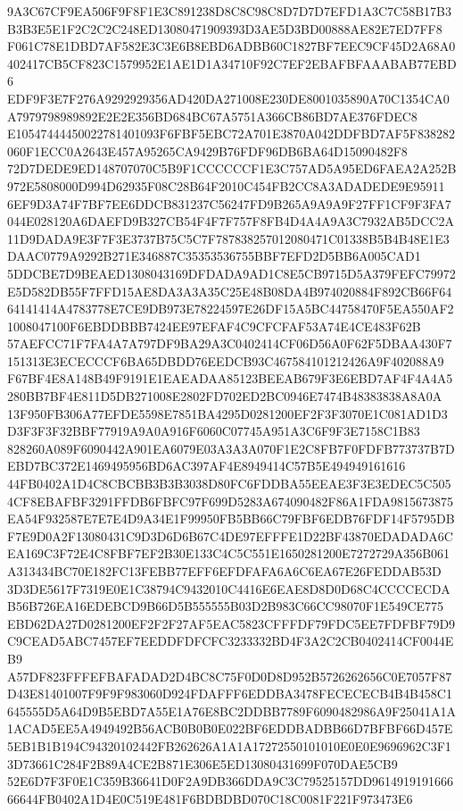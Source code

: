 \documentclass[UTF8,fontset=fandol,zihao=-4,a4paper]{ctexart}
\begin{document}
{{9A3C67CF9EA506F9F8F1E3C891238D8C8C98C8D7D7D7EFD1A3C7C58B17B3B3B3E5E1F2C2C2C248ED13080471909393D3AE5D3BD00888AE82E7ED7FF8
F061C78E1DBD7AF582E3C3E6B8EBD6ADBB60C1827BF7EEC9CF45D2A68A0402417CB5CF823C1579952E1AE1D1A34710F92C7EF2EBAFBFAAABAB77EBD6
EDF9F3E7F276A9292929356AD420DA271008E230DE8001035890A70C1354CA0A7979798989892E2E2E356BD684BC67A5751A366CB86BD7AE376FDEC8
E10547444450022781401093F6FBF5EBC72A701E3870A042DDFBD7AF5F838282060F1ECC0A2643E457A95265CA9429B76FDF96DB6BA64D15090482F8
72D7DEDE9ED148707070C5B9F1CCCCCCF1E3C757AD5A95ED6FAEA2A252B972E5808000D994D62935F08C28B64F2010C454FB2CC8A3ADADEDE9E95911
6EF9D3A74F7BF7EE6DDCB831237C56247FD9B265A9A9A9F27FF1CF9F3FA7044E028120A6DAEFD9B327CB54F4F7F757F8FB4D4A4A9A3C7932AB5DCC2A
11D9DADA9E3F7F3E3737B75C5C7F787838257012080471C01338B5B4B48E1E3DAAC0779A9292B271E346887C35353536755BBF7EFD2D5BB6A005CAD1
5DDCBE7D9BEAED1308043169DFDADA9AD1C8E5CB9715D5A379FEFC79972E5D582DB55F7FFD15AE8DA3A3A35C25E48B08DA4B974020884F892CB66F64
64141414A4783778E7CE9DB973E78224597E26DF15A5BC44758470F5EA550AF21008047100F6EBDDBBB7424EE97EFAF4C9CFCFAF53A74E4CE483F62B
57AEFCC71F7FA4A7A797DF9BA29A3C0402414CF06D56A0F62F5DBAA430F7151313E3ECECCCF6BA65DBDD76EEDCB93C467584101212426A9F402088A9
F67BF4E8A148B49F9191E1EAEADAA85123BEEAB679F3E6EBD7AF4F4A4A5280BB7BF4E811D5DB271008E2802FD702ED2BC0946E7474B48383838A8A0A
13F950FB306A77EFDE5598E7851BA4295D0281200EF2F3F3070E1C081AD1D3D3F3F3F32BBF77919A9A0A916F6060C07745A951A3C6F9F3E7158C1B83
828260A089F6090442A901EA6079E03A3A3A070F1E2C8FB7F0FDFB773737B7DEBD7BC372E1469495956BD6AC397AF4E8949414C57B5E494949161616
44FB0402A1D4C8CBCBB3B3B3038D80FC6FDDBA55EEAE3F3E3EDEC5C5054CF8EBAFBF3291FFDB6FBFC97F699D5283A674090482F86A1FDA9815673875
EA54F932587E7E7E4D9A34E1F99950FB5BB66C79FBF6EDB76FDF14F5795DBF7E9D0A2F13080431C9D3D6D6B67C4DE97EFFFE1D22BF43870EDADADA6C
EA169C3F72E4C8FBF7EF2B30E133C4C5C551E1650281200E7272729A356B061A313434BC70E182FC13FEBB77EFF6EFDFAFA6A6C6EA67E26FEDDAB53D
3D3DE5617F7319E0E1C38794C9432010C4416E6EAE8D8D0D68C4CCCCECDAB56B726EA16EDEBCD9B66D5B555555B03D2B983C66CC98070F1E549CE775
EBD62DA27D0281200EF2F2F27AF5EAC5823CFFFDF79FDC5EE7FDFBF79D9C9CEAD5ABC7457EF7EEDDFDFCFC3233332BD4F3A2C2CB0402414CF0044EB9
A57DF823FFFEFBAFADAD2D4BC8C75F0D0D8D952B5726262656C0E7057F87D43E81401007F9F9F983060D924FDAFFF6EDDBA3478FECECECB4B4B458C1
645555D5A64D9B5EBD7A55E1A76E8BC2DDBB7789F6090482986A9F25041A1A1ACAD5EE5A4949492B56ACB0B0B0E022BF6EDDBADBB66D7BFBF66D457E
5EB1B1B194C94320102442FB262626A1A1A17272550101010E0E0E9696962C3F13D73661C284F2B89A4CE2B871E306E5ED13080431699F070DAE5CB9
52E6D7F3F0E1C359B36641D0F2A9DB366DDA9C3C79525157DD961491919166666644FB0402A1D4E0C519E481F6BDBDBD070C18C0081F221F973473E6
}}
\end{document}
